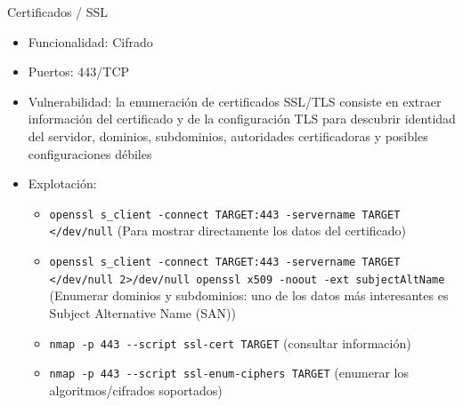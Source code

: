 \documentclass[aspectratio=169,11pt]{beamer}
\newcommand{\cmd}[1]{\texttt{#1}}
\begin{document}
\begin{frame}[allowframebreaks]{Certificados / SSL}
\small
  \begin{itemize}
  \item Funcionalidad: Cifrado
  \item Puertos: 443/TCP
  \item Vulnerabilidad: la enumeración de certificados SSL/TLS consiste en extraer información del certificado y de la configuración TLS para descubrir identidad del servidor, dominios, subdominios, autoridades certificadoras y posibles configuraciones débiles
  \item Explotación:
    \begin{itemize}
      \item \cmd{openssl s\_client -connect TARGET:443 -servername TARGET </dev/null} (Para mostrar directamente los datos del certificado)
      \item \cmd{openssl s\_client -connect TARGET:443 -servername TARGET </dev/null 2>/dev/null \textbar{} openssl x509 -noout -ext subjectAltName} (Enumerar dominios y subdominios: uno de los datos más interesantes es Subject Alternative Name (SAN))
      \item \cmd{nmap -p 443 -{}-script ssl-cert TARGET} (consultar información)
      \item \cmd{nmap -p 443 -{}-script ssl-enum-ciphers TARGET} (enumerar los algoritmos/cifrados soportados)
   \end{itemize}


\end{itemize}
\end{frame}
\end{document}
